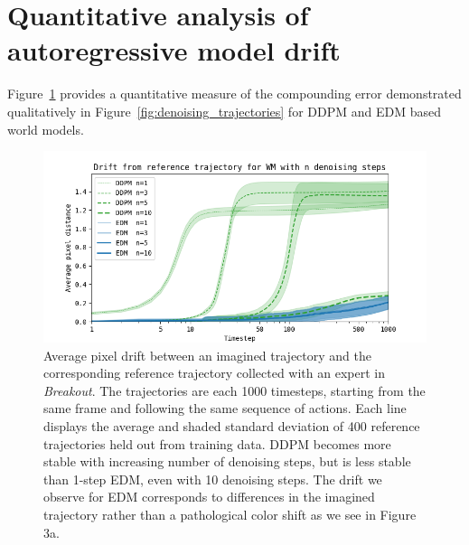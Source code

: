 \section{Quantitative analysis of autoregressive model drift}\label{app:ddpm_drift}

Figure~\ref{fig:ddpm_drift} provides a quantitative measure of the compounding error demonstrated qualitatively in Figure~\ref{fig:denoising_trajectories} for DDPM and EDM based world models.

\begin{figure}[h!]
\begin{center}
\centerline{\includegraphics[width=\columnwidth]{images/drift.png}}
\caption{Average pixel drift between an imagined trajectory and the corresponding reference trajectory collected with an expert in \textit{Breakout}. The trajectories are each 1000 timesteps, starting from the same frame and following the same sequence of actions. Each line displays the average and shaded standard deviation of 400 reference trajectories held out from training data. DDPM becomes more stable with increasing number of denoising steps, but is less stable than 1-step EDM, even with 10 denoising steps. The drift we observe for EDM corresponds to differences in the imagined trajectory rather than a pathological color shift as we see in Figure 3a.}
\label{fig:ddpm_drift}
\end{center}
\end{figure}